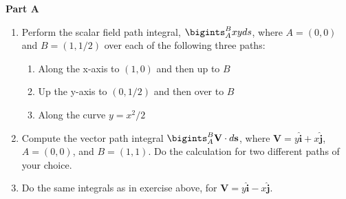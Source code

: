 \documentclass[fleqn]{article}
\begin{document}
  \textbf{Part A}
  \begin{enumerate}
    \item  Perform the scalar field path integral, $\bigints_A^B xy ds$, where $A=(0,0)$ and $B=(1,1/2)$ over each of the following three paths:
      \begin{enumerate}
      \item Along the x-axis to $(1, 0)$ and then up to $B$
      \item Up the y-axis to $(0, 1/2)$ and then over to $B$

      \item Along the curve $y = x^2/2$ 
      \end{enumerate}

    \item Compute the vector path integral $\bigints_A^B \mathbf{V}\cdot d\mathbf{s}$, where $\mathbf{V}=y \mathbf{\hat i} + x \mathbf{\hat j}$, $A=(0,0)$, and $B=(1,1)$. Do the calculation for two different paths of your choice. 

    \item Do the same integrals as in exercise above, for $\mathbf{V}=y \mathbf{\hat i} - x \mathbf{\hat j}$. 

  \end{enumerate}
\end{document}
